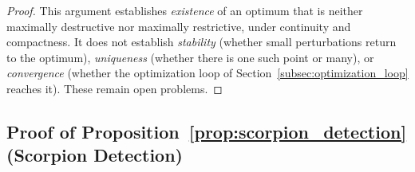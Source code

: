 \begin{proof}
This argument establishes \emph{existence} of an optimum that is neither
maximally destructive nor maximally restrictive, under continuity and
compactness. It does not establish \emph{stability} (whether small
perturbations return to the optimum), \emph{uniqueness} (whether there is one
such point or many), or \emph{convergence} (whether the optimization loop of
Section~\ref{subsec:optimization_loop} reaches it). These remain open
problems.
\end{proof}


\subsection{Proof of Proposition~\ref{prop:scorpion_detection} (Scorpion Detection)}
\label{app:proof_scorpion}

